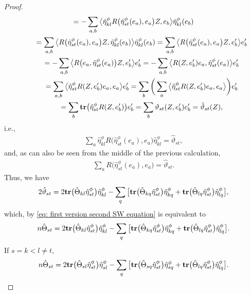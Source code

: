 \documentclass[10pt,a4paper]{amsart}
\newcommand{\tr}{\mbox{\bf tr}}
\numberwithin{equation}{section}
\begin{document}
\begin{proof}
\begin{gather*}
 = -\sum_{a,b}\big\langle \hat{\eta}^\phi_{kl}{R\big(\hat\eta_{st}^\phi(e_a),e_a\big)}Z,e_b\big\rangle \hat{\eta}^\phi_{kl}(e_b)\\
 \qquad{} = \sum_{a,b}\big\langle {R\big(\hat\eta_{st}^\phi(e_a),e_a\big)}Z,\hat{\eta}^\phi_{kl}(e_b)\big\rangle \hat{\eta}^\phi_{kl}(e_b)
 = \sum_{a,b}\big\langle {R\big(\hat\eta_{st}^\phi(e_a),e_a\big)}Z,e_b'\big\rangle e_b'\\
 \qquad{} = -\sum_{a,b}\big\langle {R\big(e_a,\hat\eta_{st}^\phi(e_a)\big)}Z,e_b'\big\rangle e_b'
 = -\sum_{a,b}\big\langle {R(Z,e_b')}e_a,\hat\eta_{st}^\phi(e_a)\big\rangle e_b'\\
 \qquad{} = \sum_{a,b}\big\langle \hat\eta_{st}^\phi{R(Z,e_b')}e_a,e_a\big\rangle e_b' =
\sum_{b}\bigg(\sum_{a}\big\langle \hat\eta_{st}^\phi{R(Z,e_b')}e_a,e_a\big\rangle \bigg)e_b'\\
 \qquad{} = \sum_{b}\tr\big(\hat\eta_{st}^\phi{R(Z,e_b')}\big)e_b' =\sum_{b}\vartheta_{st}(Z,e_b')e_b' = \hat\vartheta_{st}(Z),
\end{gather*}
i.e.,
\begin{gather*}
\sum_a\hat{\eta}^\phi_{kl}{R\big(\hat\eta_{st}^\phi(e_a),e_a\big)}\hat{\eta}^\phi_{kl} = \hat\vartheta_{st},
\end{gather*}
and, as can also be seen from the middle of the previous calculation,
\begin{gather*}
\sum_a{R\big(\hat\eta_{st}^\phi(e_a),e_a\big)} =\hat\vartheta_{st}.
\end{gather*}
Thus, we have
\begin{gather*}
2\hat\vartheta_{st} =2\tr\big(\hat\Theta_{kl}\hat\eta_{st}^\phi\big)\hat\eta_{kl}^\phi
 -\sum_{q} \big[\tr\big(\hat\Theta_{kq}\hat\eta_{st}^\phi\big) \hat{\eta}^\phi_{kq}
 + \tr\big(\hat\Theta_{lq}\hat\eta_{st}^\phi\big)\hat{\eta}^\phi_{lq}\big],
\end{gather*}
which, by \eqref{eq: first version second SW equation} is equivalent to
\begin{gather*}
n\hat\Theta_{st} =2\tr\big(\hat\Theta_{kl}\hat\eta_{st}^\phi\big)\hat\eta_{kl}^\phi
 -\sum_{q} \big[\tr\big(\hat\Theta_{kq}\hat\eta_{st}^\phi\big) \hat{\eta}^\phi_{kq}
 + \tr\big(\hat\Theta_{lq}\hat\eta_{st}^\phi\big)\hat{\eta}^\phi_{lq}\big] .
\end{gather*}
If $s=k<l\not =t$,
\begin{gather*}
n\hat\Theta_{st} =
2\tr\big(\hat\Theta_{sl}\hat\eta_{st}^\phi\big)\hat\eta_{sl}^\phi
 -\sum_{q} \big[\tr\big(\hat\Theta_{sq}\hat\eta_{st}^\phi\big) \hat{\eta}^\phi_{sq}
 + \tr\big(\hat\Theta_{lq}\hat\eta_{st}^\phi\big)\hat{\eta}^\phi_{lq}\big] .

\end{gather*}
\end{proof}
\end{document}
